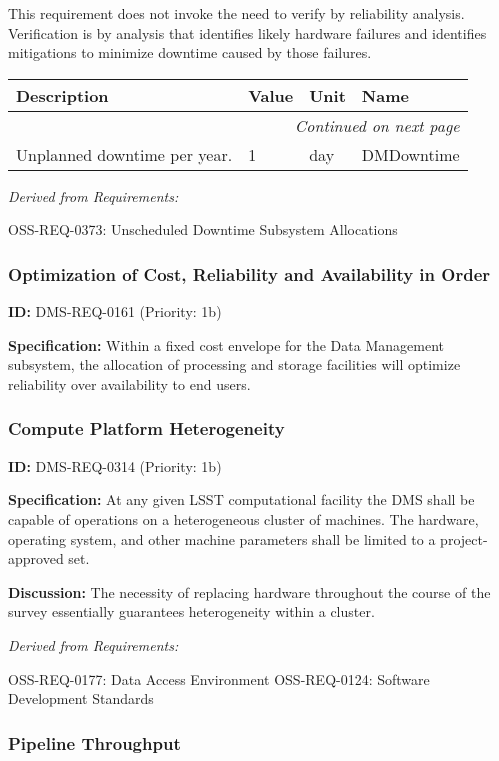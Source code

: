 \documentclass[SE,toc,lsstdraft]{lsstdoc}
\makeatletter
\newcommand{\paramname}[1]{\hspace{0pt}#1}
\newcommand{\unitname}[1]{\hspace{0pt}#1}
\newenvironment{parameters}[0]{%
\setlength\LTleft{0pt}
\setlength\LTright{\fill}
\begin{small}
\begin{longtable}[]{|p{0.49\textwidth}|l|p{0.6in}|p{1.70in}@{}|}

\hline \textbf{Description} & \textbf{Value} & \textbf{Unit} & \textbf{Name} \\ \hline
\endhead

\hline \multicolumn{4}{r}{\emph{Continued on next page}} \\
\endfoot

\hline\hline
\endlastfoot
}{%
\hline
\end{longtable}
\end{small}
}
\makeatother
\begin{document}
This requirement does not invoke the need to verify by reliability analysis. Verification is by analysis that identifies likely hardware failures and identifies mitigations to minimize downtime caused by those failures.

\begin{parameters}
Unplanned downtime per year.
&
1
&
\unitname{%
day
}
&
\paramname{%
DMDowntime
} \\\hline
\end{parameters}

\emph{Derived from Requirements:}

OSS-REQ-0373:
Unscheduled Downtime Subsystem Allocations \newline

\subsubsection{Optimization of Cost, Reliability and Availability in Order}

\label{DMS-REQ-0161}
\textbf{ID:} DMS-REQ-0161 (Priority: 1b)

\textbf{Specification:} Within a fixed cost envelope for the Data Management subsystem, the allocation of processing and storage facilities will optimize reliability over availability to end users.

\subsubsection{Compute Platform Heterogeneity}

\label{DMS-REQ-0314}
\textbf{ID:} DMS-REQ-0314 (Priority: 1b)

\textbf{Specification:} At any given LSST computational facility the DMS shall be capable of operations on a heterogeneous cluster of machines. The hardware, operating system, and other machine parameters shall be limited to a project-approved set.

\textbf{Discussion: }The necessity of replacing hardware throughout the course of the survey essentially guarantees heterogeneity within a cluster.

\emph{Derived from Requirements:}

OSS-REQ-0177:
Data Access Environment \newline
OSS-REQ-0124:
Software Development Standards \newline

\subsubsection{Pipeline Throughput}
\end{document}
